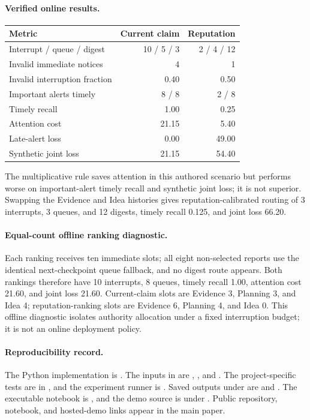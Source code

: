 \paragraph{Verified online results.}
\begin{center}
\small
\begin{tabular}{@{}lrr@{}}
\toprule
\textbf{Metric} & \textbf{Current claim} & \textbf{Reputation} \\
\midrule
Interrupt / queue / digest & 10 / 5 / 3 & 2 / 4 / 12 \\
Invalid immediate notices & 4 & 1 \\
Invalid interruption fraction & 0.40 & 0.50 \\
Important alerts timely & 8 / 8 & 2 / 8 \\
Timely recall & 1.00 & 0.25 \\
Attention cost & 21.15 & 5.40 \\
Late-alert loss & 0.00 & 49.00 \\
Synthetic joint loss & 21.15 & 54.40 \\
\bottomrule
\end{tabular}
\end{center}
The multiplicative rule saves attention in this authored scenario but performs worse on important-alert timely recall and synthetic joint loss; it is not superior. Swapping the Evidence and Idea histories gives reputation-calibrated routing of 3 interrupts, 3 queues, and 12 digests, timely recall 0.125, and joint loss 66.20.

\paragraph{Equal-count offline ranking diagnostic.}
Each ranking receives ten immediate slots; all eight non-selected reports use the identical next-checkpoint queue fallback, and no digest route appears. Both rankings therefore have 10 interrupts, 8 queues, timely recall 1.00, attention cost 21.60, and joint loss 21.60. Current-claim slots are Evidence 3, Planning 3, and Idea 4; reputation-ranking slots are Evidence 6, Planning 4, and Idea 0. This offline diagnostic isolates authority allocation under a fixed interruption budget; it is not an online deployment policy.

\begingroup
\raggedright
\paragraph{Reproducibility record.}
The Python implementation is . The inputs in  are , , and . The project-specific tests are in , and the experiment runner is . Saved outputs under  are  and . The executable notebook is , and the demo source is under . Public repository, notebook, and hosted-demo links appear in the main paper.

